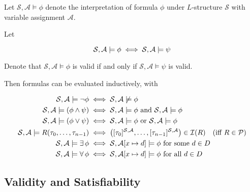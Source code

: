 \begin{remark}
    Let $\mathcal{S}, \mathcal{A} \models \phi$ denote the interpretation of formula $\phi$ 
    under $L$-structure $\mathcal{S}$ with variable assignment $\mathcal{A}$.
    
    Let
    
    \begin{equation*}
        \mathcal{S}, \mathcal{A} \models \phi \;\Longleftrightarrow\; \mathcal{S}, \mathcal{A} \models \psi
    \end{equation*}
    
    Denote that $\mathcal{S}, \mathcal{A} \models \phi$ is valid if and only if
    $\mathcal{S}, \mathcal{A} \models \psi$ is valid.
\end{remark}

\begin{definition}
    Then formulas can be evaluated inductively, with
    
    \begin{align}
        \mathcal{S}, \mathcal{A} \models \neg \phi 
            &\;\Longleftrightarrow\; \mathcal{S}, \mathcal{A} \not\models \phi \\
        \mathcal{S}, \mathcal{A} \models (\phi \land \psi)
            &\;\Longleftrightarrow\; \mathcal{S}, \mathcal{A} \models \phi
                \text{ and } \mathcal{S}, \mathcal{A} \models \phi \\
        \mathcal{S}, \mathcal{A} \models (\phi \lor \psi)
            &\;\Longleftrightarrow\; \mathcal{S}, \mathcal{A} \models \phi
                \text{ or } \mathcal{S}, \mathcal{A} \models \phi \\
        \mathcal{S}, \mathcal{A} \models R(\tau_0, \dots, \tau_{n-1})
            &\;\Longleftrightarrow\; \left(
                [\tau_0]^{\mathcal{S}, \mathcal{A}},
                \ldots, 
                [\tau_{n-1}]^{\mathcal{S}, \mathcal{A}} 
            \right) \in \mathcal{I}(R) \quad\text{(iff $R \in \mathcal{P}$)} \\
        \mathcal{S}, \mathcal{A} \models \operatorname{\exists} \phi
            &\;\Longleftrightarrow\; \mathcal{S}, \mathcal{A}[x \mapsto d] \models \phi 
            \text{ for some } d \in D \\
        \mathcal{S}, \mathcal{A} \models \operatorname{\forall} \phi
            &\;\Longleftrightarrow\; \mathcal{S}, \mathcal{A}[x \mapsto d] \models \phi
            \text{ for all } d \in D
    \end{align}
\end{definition}

\subsection{Validity and Satisfiability}

